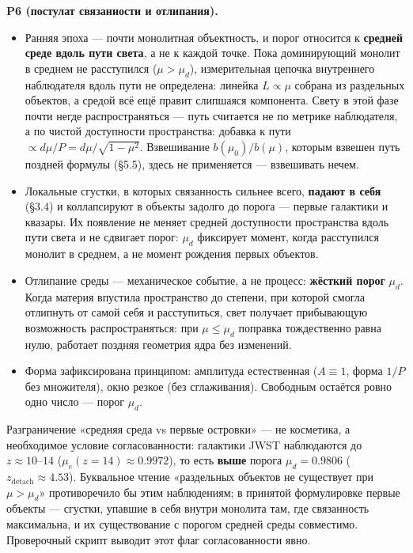 \documentclass{article}
\begin{document}
\medskip
\noindent\textbf{P6 (постулат связанности и отлипания).}
\begin{itemize}
  \item Ранняя эпоха --- почти монолитная объектность, и порог относится к \textbf{средней среде вдоль пути света}, а не к каждой точке. Пока доминирующий монолит в среднем не расступился ($\mu > \mu_d$), измерительная цепочка внутреннего наблюдателя вдоль пути не определена: линейка $L \propto \mu$ собрана из раздельных объектов, а средой всё ещё правит слипшаяся компонента. Свету в этой фазе почти негде распространяться --- путь считается не по метрике наблюдателя, а по чистой доступности пространства: добавка к пути $\propto d\mu/P = d\mu/\sqrt{1-\mu^2}$. Взвешивание $b(\mu_0)/b(\mu)$, которым взвешен путь поздней формулы (\S5.5), здесь не применяется --- взвешивать нечем.
  \item Локальные сгустки, в которых связанность сильнее всего, \textbf{падают в себя} (\S3.4) и коллапсируют в объекты задолго до порога --- первые галактики и квазары. Их появление не меняет средней доступности пространства вдоль пути света и не сдвигает порог: $\mu_d$ фиксирует момент, когда расступился монолит в среднем, а не момент рождения первых объектов.
  \item Отлипание среды --- механическое событие, а не процесс: \textbf{жёсткий порог} $\mu_d$. Когда материя впустила пространство до степени, при которой смогла отлипнуть от самой себя и расступиться, свет получает прибывающую возможность распространяться: при $\mu \le \mu_d$ поправка тождественно равна нулю, работает поздняя геометрия ядра без изменений.
  \item Форма зафиксирована принципом: амплитуда естественная ($A \equiv 1$, форма $1/P$ без множителя), окно резкое (без сглаживания). Свободным остаётся ровно одно число --- порог $\mu_d$.
\end{itemize}

Разграничение «средняя среда vs первые островки» --- не косметика, а необходимое условие согласованности: галактики JWST наблюдаются до $z \approx 10\text{--}14$ ($\mu_e(z{=}14) \approx 0.9972$), то есть \textbf{выше} порога $\mu_d = 0.9806$ ($z_{\text{detach}} \approx 4.53$). Буквальное чтение «раздельных объектов не существует при $\mu > \mu_d$» противоречило бы этим наблюдениям; в принятой формулировке первые объекты --- сгустки, упавшие в себя внутри монолита там, где связанность максимальна, и их существование с порогом средней среды совместимо. Проверочный скрипт выводит этот флаг согласованности явно.
\end{document}
